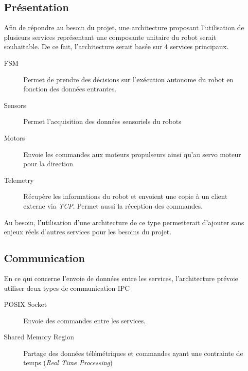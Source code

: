 \subsection{Présentation}

Afin de répondre au besoin du projet, une architecture proposant l'utilisation de plusieurs services représentant une composante unitaire du robot serait souhaitable.
De ce fait, l'architecture serait basée sur 4 services principaux.

\begin{description}
    \item[FSM] Permet de prendre des décisions sur l'exécution autonome du robot en fonction des données entrantes.
    \item[Sensors] Permet l'acquisition des données sensoriels du robots
    \item[Motors] Envoie les commandes aux moteurs propulseurs ainsi qu'au servo moteur pour la direction
    \item[Telemetry] Récupère les informations du robot et envoient une copie à un client externe via \textit{TCP}. Permet aussi la réception des commandes.   
\end{description}

Au besoin, l'utilisation d'une architecture de ce type permetterait d'ajouter sans enjeux réels d'autres services pour les besoins du projet.

\subsection{Communication}
En ce qui concerne l'envoie de données entre les services, l'architecture prévoie utiliser deux types de communication IPC

\begin{description}
    \item[POSIX Socket] Envoie des commandes entre les services.
    \item[Shared Memory Region] Partage des données télémétriques et commandes ayant une contrainte de temps (\textit{Real Time Processing})  
\end{description}

